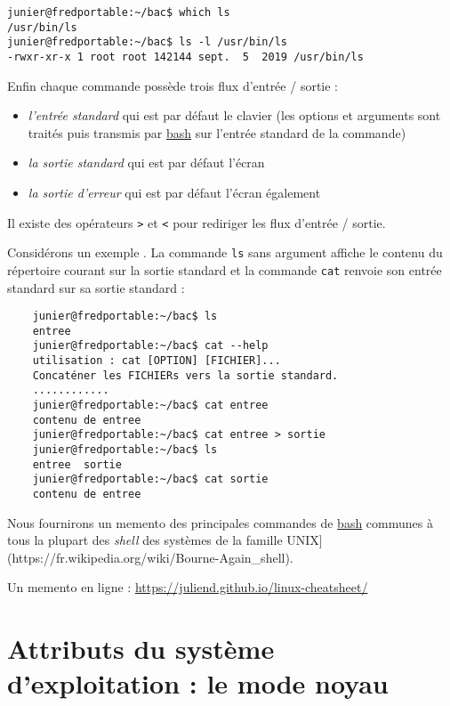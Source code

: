 \documentclass[
  11pt,
]{article}
\providecommand{\tightlist}{%
  \setlength{\itemsep}{0pt}\setlength{\parskip}{0pt}}
\begin{document}
\begin{verbatim}
junier@fredportable:~/bac$ which ls
/usr/bin/ls
junier@fredportable:~/bac$ ls -l /usr/bin/ls
-rwxr-xr-x 1 root root 142144 sept.  5  2019 /usr/bin/ls
\end{verbatim}

Enfin chaque commande possède trois flux d'entrée / sortie :

\begin{itemize}
\tightlist
\item
  \emph{l'entrée standard} qui est par défaut le clavier (les options et
  arguments sont traités puis transmis par
  \href{https://fr.wikipedia.org/wiki/Bourne-Again_shell}{bash} sur
  l'entrée standard de la commande)
\item
  \emph{la sortie standard} qui est par défaut l'écran
\item
  \emph{la sortie d'erreur} qui est par défaut l'écran également
\end{itemize}

Il existe des opérateurs \texttt{\textgreater{}} et \texttt{\textless{}}
pour rediriger les flux d'entrée / sortie.

Considérons un exemple . La commande \texttt{ls} sans argument affiche
le contenu du répertoire courant sur la sortie standard et la commande
\texttt{cat} renvoie son entrée standard sur sa sortie standard :

\begin{verbatim}
    junier@fredportable:~/bac$ ls 
    entree
    junier@fredportable:~/bac$ cat --help 
    utilisation : cat [OPTION] [FICHIER]...
    Concaténer les FICHIERs vers la sortie standard.
    ............
    junier@fredportable:~/bac$ cat entree
    contenu de entree
    junier@fredportable:~/bac$ cat entree > sortie
    junier@fredportable:~/bac$ ls
    entree  sortie
    junier@fredportable:~/bac$ cat sortie
    contenu de entree
\end{verbatim}

Nous fournirons un memento des principales commandes de
\href{https://fr.wikipedia.org/wiki/Bourne-Again_shell}{bash} communes à
tous la plupart des \emph{shell} des systèmes de la famille
UNIX{]}(https://fr.wikipedia.org/wiki/Bourne-Again\_shell).

Un memento en ligne : \url{https://juliend.github.io/linux-cheatsheet/}

\hypertarget{attributs-du-systuxe8me-dexploitation-le-mode-noyau}{%
\section{Attributs du système d'exploitation : le mode
noyau}\label{attributs-du-systuxe8me-dexploitation-le-mode-noyau}}
\end{document}
